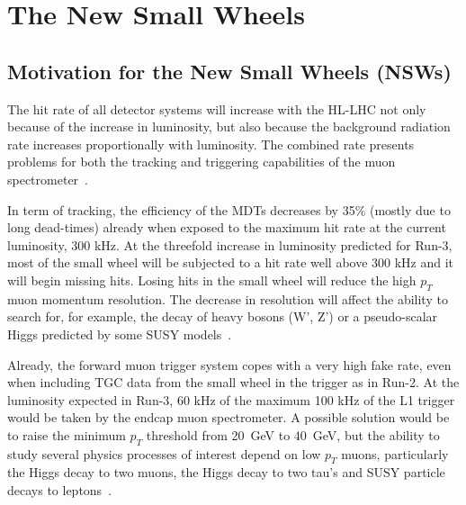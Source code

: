 
\chapter{The New Small Wheels}
\label{chap:nsw}

\section{Motivation for the New Small Wheels (NSWs)}

The hit rate of all detector systems will increase with the HL-LHC not only because of the increase in luminosity, but also because the background radiation rate increases proportionally with luminosity. The combined rate presents problems for both the tracking and triggering capabilities of the muon spectrometer~\cite{nsw_tdr}.

In term of tracking, the efficiency of the MDTs decreases by 35\% (mostly due to long dead-times) already when exposed to the maximum hit rate at the current luminosity, 300 kHz.
At the threefold increase in luminosity predicted for Run-3, most of the small wheel will be subjected to a hit rate well above 300 kHz and it will begin missing hits. Losing hits in the small wheel will reduce the high $p_T$ muon momentum resolution. The decrease in resolution will affect the ability to search for, for example, the decay of heavy bosons (W', Z') or a pseudo-scalar Higgs predicted by some SUSY models~\cite{dainese_physics_2018}.

Already, the forward muon trigger system copes with a very high fake rate, even when including TGC data from the small wheel in the trigger as in Run-2. At the luminosity expected in Run-3, 60 kHz of the maximum 100 kHz of the L1 trigger would be taken by the endcap muon spectrometer. A possible solution would be to raise the minimum $p_T$ threshold from \SI{20}{\giga\electronvolt} to \SI{40}{\giga\electronvolt}, but the ability to study several physics processes of interest depend on low $p_T$ muons, particularly the Higgs decay to two muons, the Higgs decay to two tau's and SUSY particle decays to leptons~\cite{nsw_tdr}.

